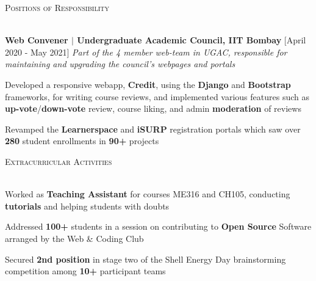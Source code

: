 \documentclass[10pt]{article}
\renewcommand{\section}[1]{
    \vspace*{5pt}
    \textsc{\Large{#1}}
    \vspace*{-8pt} \\ \hspace*{-5pt}
    \hrulefill \\
    \vspace*{-15pt}
    \vspace*{-5pt}
}
\newcommand{\smallbullet}{
    \small$\bullet$
}
\newenvironment{bullet-list-major}{
    \vspace*{8pt}
    \begin{list}{
        \smallbullet
    }{
        \setlength\leftmargin{15pt}\topsep -5pt \itemsep -6pt
    }
} {
    \end{list}
}
\newcommand{\bigblock}[3]{
    {
        \vspace*{3pt}
        \hspace*{-7pt} {\large{\textbf{#1}}} \hfill #2 \newline
        \textit{\textsf{#3}}
    }
}
\newenvironment{bullet-list-minor}{
    \begin{list}{
        \smallbullet
    }{
        \setlength\leftmargin{15pt}\topsep -6pt \itemsep -5pt
    }
} {
    \end{list}
}
\begin{document}

    \section{Positions of Responsibility}

    \bigblock{
        Web Convener \(|\) Undergraduate Academic Council, IIT Bombay
    }{
        [April 2020 - May 2021]
    }{
        Part of the 4 member web-team in UGAC, responsible for maintaining and upgrading the council's webpages and portals
    }
    \begin{bullet-list-minor}
        \item Developed a responsive webapp, \textbf{Credit}, using the \textbf{Django} and \textbf{Bootstrap} frameworks, for writing course reviews, and implemented various features such as \textbf{up-vote}/\textbf{down-vote} review, course liking, and admin \textbf{moderation} of reviews
        \item Revamped the \textbf{Learnerspace} and \textbf{iSURP} registration portals which saw over \textbf{280} student enrollments in \textbf{90+} projects
    \end{bullet-list-minor}


    \section{Extracurricular Activities}

    \begin{bullet-list-major}
        \item Worked as \textbf{Teaching Assistant} for courses ME316 and CH105, conducting \textbf{tutorials} and helping students with doubts
        \item Addressed \textbf{100+} students in a session on contributing to \textbf{Open Source} Software arranged by the Web \& Coding Club
        \item Secured \textbf{2nd position} in stage two of the Shell Energy Day brainstorming competition among \textbf{10+} participant teams
    \end{bullet-list-major}


    \vspace*{-7.71mm}
\end{document}
